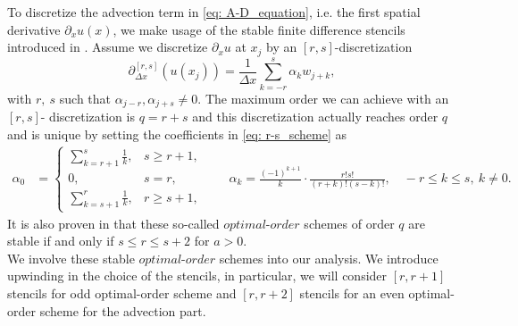 To discretize the advection term in \eqref{eq: A-D_equation}, i.e. the first spatial derivative $\partial_xu(x)$, we make usage of the stable finite difference stencils introduced in \cite{Iserles1982}. Assume we discretize $\partial_xu$ at $x_j$ by an $[r,s]$-discretization
\begin{equation}\label{eq: r-s_scheme}
\partial^{[r,s]}_{\Delta x}(u(x_j)) = \frac{1}{\Delta x} \sum\limits_{k=-r}^s \alpha_k w_{j+k},
\end{equation}
with $r,\ s$ such that $\alpha_{j-r}, \alpha_{j+s} \neq 0$.
The maximum order we can achieve with an $[r,s]$- discretization is $q=r+s$ and this discretization actually reaches order $q$ and is unique by setting the coefficients in \eqref{eq: r-s_scheme} as
	\begin{align}\label{eq:def_advection_optimal_stencil}
	\alpha_0&=
	\begin{cases}
	\sum\limits_{k=r+1}^s\frac{1}{k}, & s\ge r+1, \\
	0, & s=r, \\
	\sum\limits_{k=s+1}^r\frac{1}{k}, & r\ge s+1, 
	\end{cases} \qquad
	\alpha_k = \frac{(-1)^{k+1}}{k}\cdot \frac{r!s!}{(r+k)!(s-k)!}, \quad -r\le k \le s, \ k\neq0.
	\end{align}
 It is also proven in \cite{Iserles1982} that these so-called $\textit{optimal-order}$ schemes of order $q$ are stable if and only if $s\le r \le s+2$ for $a>0$.\\
We  involve these stable $\textit{optimal-order}$ schemes into our analysis. 
We introduce upwinding in the choice of the stencils, in particular, we will consider $[r, r +1]$ stencils for odd optimal-order scheme and $[r, r+2]$ stencils for an even optimal-order scheme for the advection part.

